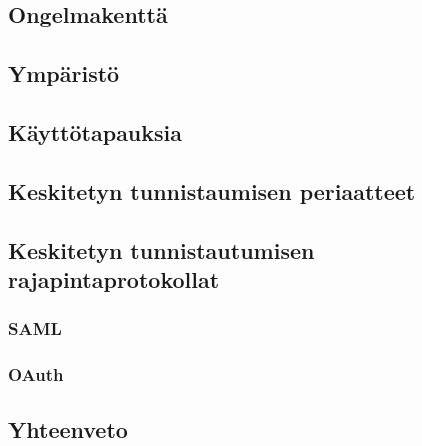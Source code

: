 \subsection{Ongelmakenttä}

\subsection{Ympäristö}

\subsection{Käyttötapauksia}

\subsection{Keskitetyn tunnistaumisen periaatteet}

\subsection{Keskitetyn tunnistautumisen rajapintaprotokollat}

\subsubsection{SAML}

\subsubsection{OAuth}

\subsection{Yhteenveto}

